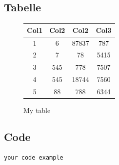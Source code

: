 \subsection{Tabelle}
\begin{figure}[!h]
    \centering
  \begin{tabular}{||c c c c||}
    \hline
    Col1 & Col2 & Col2 & Col3 \\ [0.5ex]
    \hline\hline
    1 & 6 & 87837 & 787 \\
    \hline
    2 & 7 & 78 & 5415 \\
    \hline
    3 & 545 & 778 & 7507 \\
    \hline
    4 & 545 & 18744 & 7560 \\
    \hline
    5 & 88 & 788 & 6344 \\ [1ex]
    \hline
  \end{tabular}

  \caption{My table}
\end{figure}

\subsection{Code}
\begin{verbatim}
your code example
\end{verbatim}
